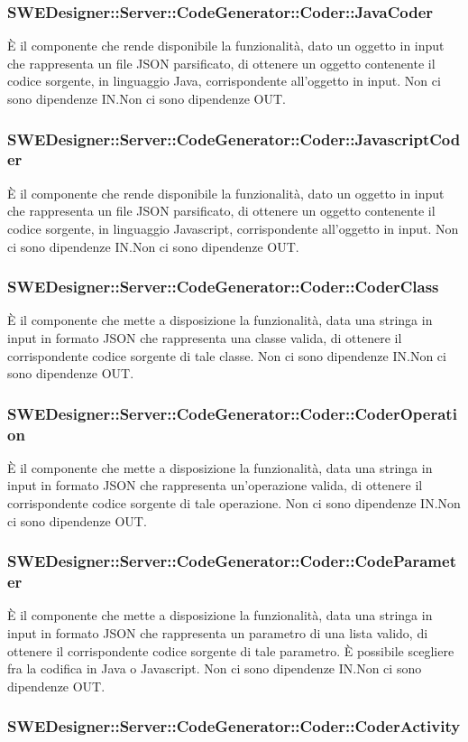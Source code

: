 \documentclass[../PianoDiQualifica.tex]{subfiles}
\begin{document}
		\subsubsection{SWEDesigner::Server::CodeGenerator::Coder::JavaCoder}
		È il componente che rende disponibile la funzionalità, dato un oggetto in input che rappresenta un file JSON parsificato, di ottenere un oggetto contenente il codice sorgente, in linguaggio Java, corrispondente all'oggetto in input.
		Non ci sono dipendenze IN.Non ci sono dipendenze OUT.\subsubsection{SWEDesigner::Server::CodeGenerator::Coder::JavascriptCoder}
		È il componente che rende disponibile la funzionalità, dato un oggetto in input che rappresenta un file JSON parsificato, di ottenere un oggetto contenente il codice sorgente, in linguaggio Javascript, corrispondente all'oggetto in input.
		Non ci sono dipendenze IN.Non ci sono dipendenze OUT.\subsubsection{SWEDesigner::Server::CodeGenerator::Coder::CoderClass}
		È il componente che mette a disposizione la funzionalità, data una stringa in input in formato JSON che rappresenta una classe valida, di ottenere il corrispondente codice sorgente di tale classe.
		Non ci sono dipendenze IN.Non ci sono dipendenze OUT.\subsubsection{SWEDesigner::Server::CodeGenerator::Coder::CoderOperation}
		È il componente che mette a disposizione la funzionalità, data una stringa in input in formato JSON che rappresenta un'operazione valida, di ottenere il corrispondente codice sorgente di tale operazione.
		Non ci sono dipendenze IN.Non ci sono dipendenze OUT.\subsubsection{SWEDesigner::Server::CodeGenerator::Coder::CodeParameter}
		È il componente che mette a disposizione la funzionalità, data una stringa in input in formato JSON che rappresenta un parametro di una lista valido, di ottenere il corrispondente codice sorgente di tale parametro. È possibile scegliere fra la codifica in Java o Javascript.
		Non ci sono dipendenze IN.Non ci sono dipendenze OUT.\subsubsection{SWEDesigner::Server::CodeGenerator::Coder::CoderActivity}
\end{document}

